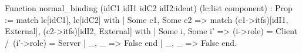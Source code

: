 Function normal_binding (idC1 idI1 idC2 idI2:ident) 
                (lc:list component)  : Prop :=
 match lc[idC1], lc[idC2] with
 | Some c1, Some c2 =>
    match (c1->itfs)[idI1, External], (c2->itfs)[idI2, External] with
     | Some i, Some i' => (i->role) = Client /\ (i'->role) = Server
     | _, _            => False
     end
 | _, _ => False
 end.